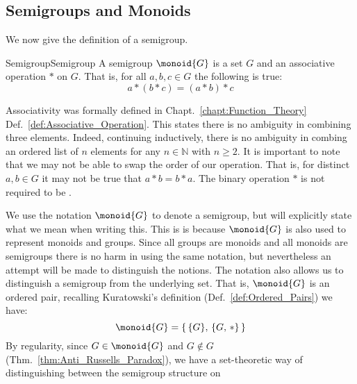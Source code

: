     \subsection{Semigroups and Monoids}
        We now give the definition of a semigroup.
        \begin{fdefinition}{Semigroup}{Semigroup}
            A \gls{semigroup} $\monoid{G}$ is a set $G$ and an
            \gls{associative operation} $*$ on $G$. That is, for all
            $a,b,c\in{G}$ the following is true:
            \begin{equation}
                \label{eqn:Semigroup_Associativity}
                a*(b*c)=(a*b)*c\tag{1}
            \end{equation}
        \end{fdefinition}
        Associativity was formally defined in Chapt.~\ref{chapt:Function_Theory}
        Def.~\ref{def:Associative_Operation}. This states there is no ambiguity
        in combining three elements. Indeed, continuing inductively, there is no
        ambiguity in combing an ordered list of $n$ elements for any
        $n\in\mathbb{N}$ with $n\geq{2}$. It is important to note that we may
        not be able to swap the order of our operation. That is, for distinct
        $a,b\in{G}$ it may not be true that $a*b=b*a$. The binary operation $*$
        is not required to be .
        \par\hfill\par
        We use the notation $\monoid{G}$ to denote a semigroup, but will
        explicitly state what we mean when writing this. This is is because
        $\monoid{G}$ is also used to represent monoids and groups. Since all
        groups are monoids and all monoids are semigroups there is no harm in
        using the same notation, but nevertheless an attempt will be made to
        distinguish the notions. The notation also allows us to distinguish a
        semigroup from the underlying set. That is, $\monoid{G}$ is an
        \gls{ordered pair}, recalling Kuratowski's definition
        (Def.~\ref{def:Ordered_Pairs}) we have:
        \begin{equation}
            \monoid{G}=\{\,\{G\},\,\{G,\,*\}\,\}
        \end{equation}
        By regularity, since $G\in\monoid{G}$ and
        $G\notin{G}$ (Thm.~\ref{thm:Anti_Russells_Paradox}), we have a
        set-theoretic way of distinguishing between the semigroup structure on
